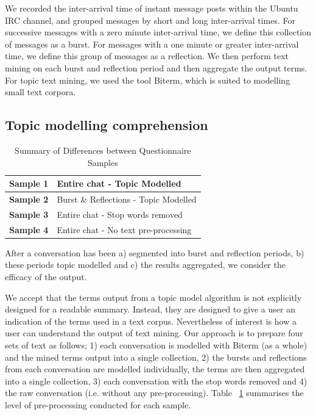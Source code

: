 We recorded the inter-arrival time of instant message posts within the Ubuntu IRC channel, and grouped messages by short and long inter-arrival times. For successive messages with a zero minute inter-arrival time, we define this collection of messages as a burst. For messages with a one minute or greater inter-arrival time, we define this group of messages as a reflection. We then perform text mining on each burst and reflection period and then aggregate the output terms. For topic text mining, we used the tool Biterm, which is suited to modelling small text corpora.

\subsection{Topic modelling comprehension}

\begin {table}[]
\caption {Summary of Differences between Questionnaire Samples} 
\label{tab:chapt7_study1_tab1a}
\begin{center}
\begin{tabular}{| p{2.5cm} | p{6.9cm}  |} \hline 
\textbf{Sample 1} & Entire chat - Topic Modelled  
\\ \hline  \textbf{Sample 2} & Burst \& Reflections - Topic Modelled
\\ \hline  \textbf{Sample 3} & Entire chat - Stop words removed 
\\ \hline  \textbf{Sample 4} & Entire chat - No text pre-processing 
\\ \hline
\end{tabular}
\end{center}
\end{table}

After a conversation has been a) segmented into burst and reflection periods, b) these periods topic modelled and c) the results aggregated, we consider the efficacy of the output. 

We accept that the terms output from a topic model algorithm is not explicitly designed for a readable summary. Instead, they are designed to give a user an indication of the terms used in a text corpus. Nevertheless of interest is how a user can understand the output of text mining. Our approach is to prepare four sets of text as follows; 1) each conversation is modelled with Biterm (as a whole) and the mined terms output into a single collection, 2) the bursts and reflections from each conversation are modelled individually, the terms are then aggregated into a single collection, 3) each conversation with the stop words removed and 4) the raw conversation (i.e. without any pre-processing). Table ~\ref{tab:chapt7_study1_tab1a} summarises the level of pre-processing conducted for each sample.

